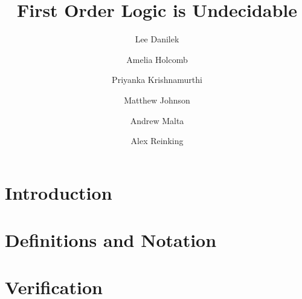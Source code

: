 \documentclass{article}
\title{First Order Logic is Undecidable}
\author{Lee Danilek \and Amelia Holcomb \and Priyanka Krishnamurthi \and Matthew Johnson \and Andrew Malta \and Alex Reinking}
\theoremstyle{definition}
\theoremstyle{definition}
\begin{document}
\maketitle

\section{Introduction}


\section{Definitions and Notation}


\section{Verification}

\end{document}

